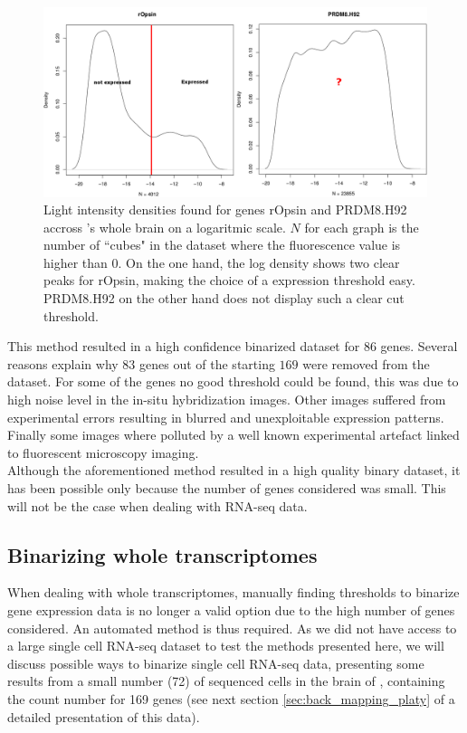 	\begin{figure}[bth]
\centerline{\includegraphics[width=\linewidth]{gfx/chapter2/densities_bina.png}}
\caption{Light intensity densities found for genes rOpsin and PRDM8.H92 accross \platy{}'s whole brain on a logaritmic scale. $N$ for each graph is the number of ``cubes" in the dataset where the fluorescence value is higher than $0$. On the one hand, the log density shows two clear peaks for rOpsin, making the choice of a expression threshold easy. PRDM8.H92 on the other hand does not display such a clear cut threshold.}\label{fig:densities_bina}
	\end{figure}
	
	This method resulted in a high confidence binarized dataset for $86$ genes. Several reasons explain why $83$ genes out of the starting $169$ were removed from the dataset. For some of the genes no good threshold could be found, this was due to high noise level in the in-situ hybridization images. Other images suffered from experimental errors resulting in blurred and unexploitable expression patterns. Finally some images where polluted by a well known experimental artefact linked to fluorescent microscopy imaging.\\
	
	Although the aforementioned method resulted in a high quality binary dataset, it has been possible only because the number of genes considered was small. This will not be the case when dealing with RNA-seq data.

  \subsection*{Binarizing whole transcriptomes}
  
  When dealing with whole transcriptomes, manually finding thresholds to binarize gene expression data is no longer a valid option due to the high number of genes considered. An automated method is thus required. As we did not have access to a large single cell RNA-seq dataset to test the methods presented here, we will discuss possible ways to binarize single cell RNA-seq data, presenting some results from a small number (72) of sequenced cells in the brain of \platy{}, containing the count number for 169 genes (see next section \ref{sec:back_mapping_platy} of a detailed presentation of this data).\\
  
